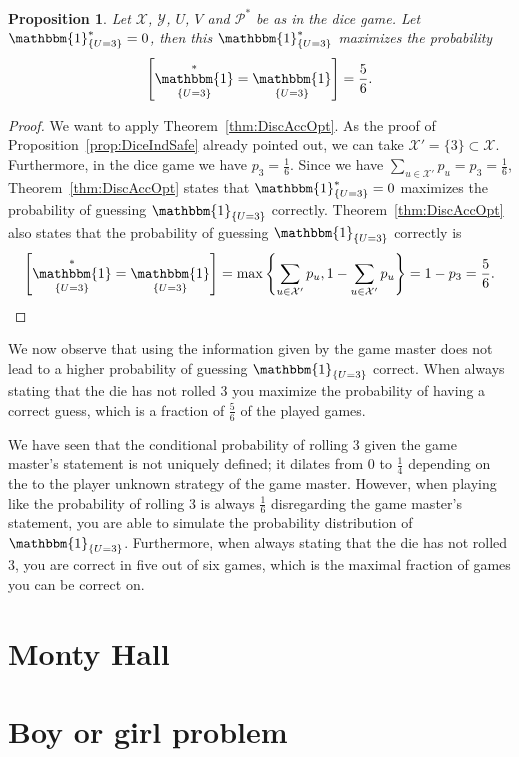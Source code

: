 \documentclass[a4paper]{report}
\theoremstyle{plain}
\newtheorem{proposition}[theorem]{Proposition}
\theoremstyle{definition}
\theoremstyle{remark}
\numberwithin{equation}{chapter}
\let\P\relax
\DeclareMathOperator{\P}{\mathbb{P}}
\DeclareMathOperator{\1}{\mathbbm{1}}
\newcommand{\X}{\mathcal{X}}
\newcommand{\Y}{\mathcal{Y}}
\newcommand{\Pmod}{\mathcal{P}^*}
\newcommand{\DieInd}{\1_{\{U=3\}}}
\begin{document}
\begin{proposition}
Let $\X$, $\Y$, $U$, $V$ and $\Pmod$ be as in the dice game. Let $\DieInd^*=0$, then this $\DieInd^*$ maximizes the probability
\begin{equation}
\P\left[\DieInd^*=\DieInd\right]=\frac{5}{6}.
\end{equation}
\end{proposition}
\begin{proof}
We want to apply Theorem~\ref{thm:DiscAccOpt}. As the proof of Proposition~\ref{prop:DiceIndSafe} already pointed out, we can take $\X'=\{3\}\subset\X$. Furthermore, in the dice game we have $p_3=\frac{1}{6}$. Since we have $\sum_{u\in\X'}p_u=p_3=\frac{1}{6}$, Theorem~\ref{thm:DiscAccOpt} states that $\DieInd^*=0$ maximizes the probability of guessing $\DieInd$ correctly. Theorem~\ref{thm:DiscAccOpt} also states that the probability of guessing $\DieInd$ correctly is
\begin{equation}
\P\left[\DieInd^*=\DieInd\right]=\max\left\{\sum_{u\in\X'}p_u,1-\sum_{u\in\X'}p_u\right\}=1-p_3=\frac{5}{6}.
\end{equation}
\end{proof}

We now observe that using the information given by the game master does not lead to a higher probability of guessing $\DieInd$ correct. When always stating that the die has not rolled $3$ you maximize the probability of having a correct guess, which is a fraction of $\frac{5}{6}$ of the played games.

We have seen that the conditional probability of rolling $3$ given the game master's statement is not uniquely defined; it dilates from $0$ to $\frac{1}{4}$ depending on the to the player unknown strategy of the game master. However, when playing like the probability of rolling $3$ is always $\frac{1}{6}$ disregarding the game master's statement, you are able to simulate the probability distribution of $\DieInd$. Furthermore, when always stating that the die has not rolled $3$, you are correct in five out of six games, which is the maximal fraction of games you can be correct on.

\section{Monty Hall}

\section{Boy or girl problem}
\end{document}

